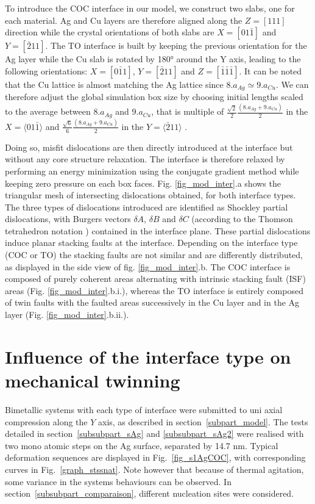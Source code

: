 \documentclass[final,3p,times,twocolumn]{elsarticle}
\begin{document}
To introduce the COC interface in our model, we construct two slabs, one for each material. Ag and Cu layers are therefore aligned along the $Z=[111]$ direction while the crystal orientations of both slabs are $X=[01\bar{1}]$ and $Y=[\bar{2}11]$. The TO interface is built by keeping the previous orientation for the Ag layer while the Cu slab is rotated by 180° around the Y axis, leading to the following orientations: $X=[0\bar{1}1]$, $Y=[\bar{2}11]$ and $Z=[\bar{1}\bar{1}\bar{1}]$. It can be noted that the Cu lattice is almost matching the Ag lattice since $8.a_{Ag}\simeq9.a_{Cu}$. We can therefore adjust the global simulation box size by choosing initial lengths scaled to the average between $8.a_{Ag}$ and $9.a_{Cu}$, that is multiple of $\frac{\sqrt{2}}{2}\frac{(8.a_{Ag}+9.a_{Cu})}{2}$ in the $X=\langle01\bar{1}\rangle$ and $\frac{\sqrt{6}}{6}\frac{(8.a_{Ag}+9.a_{Cu})}{2}$ in the $Y=\langle\bar{2}11\rangle$ \cite{li15PM}. 

Doing so, misfit dislocations are then directly introduced at the interface but without any core structure relaxation. The interface is therefore relaxed by performing an energy minimization using the conjugate gradient method while keeping zero pressure on each box faces. Fig. \ref{fig_mod_inter}.a shows the triangular mesh of intersecting dislocations obtained, for both interface types. The three types of dislocations introduced are identified as Shockley partial dislocations, with Burgers vectors $\delta A$, $\delta B$ and $\delta C$ (according to the Thomson tetrahedron notation  \cite{hirth82book}) contained in the interface plane. These partial dislocations induce planar stacking faults at the interface. Depending on the interface type (COC or TO) the stacking faults are not similar and are differently distributed, as displayed in the side view of fig. \ref{fig_mod_inter}.b. The COC interface is composed of purely coherent areas alternating with intrinsic stacking fault (ISF) areas (Fig. \ref{fig_mod_inter}.b.i.), whereas the TO interface is entirely composed of twin faults with the faulted areas successively in the Cu layer and in the Ag layer (Fig. \ref{fig_mod_inter}.b.ii.).

\section{Influence of the interface type on mechanical twinning}
\label{part_influence}

Bimetallic systems with each type of interface were submitted to uni axial compression along the $Y$ axis, as described in section~\ref{subpart_model}. The tests detailed in section~\ref{subsubpart_sAg} and \ref{subsubpart_sAg2} were realised with two mono atomic steps on the Ag surface, separated by 14.7 nm. 
Typical deformation sequences are displayed in Fig.~\ref{fig_s1AgCOC}, with corresponding curves in Fig.~\ref{graph_stssnat}. Note however that because of thermal agitation, some variance in the systems behaviours can be observed.
In section~\ref{subsubpart_comparaison}, different nucleation sites were considered.
\end{document}
